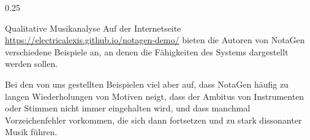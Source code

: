 \documentclass[final]{beamer}
\newcommand{\raga}{r\=aga}
\newcommand{\multani}{Mult\=an\=i}
\begin{document}
\begin{frame}[t]
\begin{columns}[t]
    \begin{column}{0.25\textwidth}
      \begin{block}{Qualitative Musikanalyse}
        Auf der Internetseite \url{https://electricalexis.github.io/notagen-demo/}
        bieten die Autoren von NotaGen verschiedene Beispiele an, an denen die 
        Fähigkeiten des Systems dargestellt werden sollen. 

        Bei den von uns gestellten Beispielen viel aber auf, dass 
        NotaGen häufig zu langen \alert{Wiederholungen} von Motiven neigt, 
        dass der \alert{Ambitus} von Instrumenten oder Stimmen nicht immer eingehalten wird, 
        und dass manchmal \alert{Vorzeichenfehler} vorkommen, die sich dann fortsetzen und zu stark 
        dissonanter Musik führen. 

        
      \end{block}
    \end{column}


\end{columns}
\end{frame}
\end{document}
